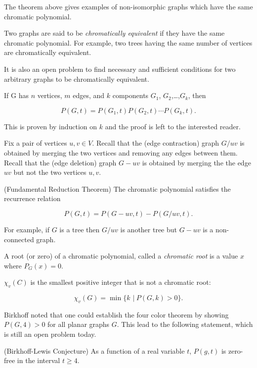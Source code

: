 The theorem above gives examples of non-isomorphic graphs which have
the same chromatic polynomial.


Two graphs are said to be {\it chromatically equivalent} if they have the
same chromatic polynomial. For example, two trees having the same
number of vertices are chromatically equivalent.

It is also an open problem to find necessary and sufficient conditions
for two arbitrary graphs to be chromatically equivalent.

\begin{theorem}
If G has $n$ vertices, $m$ edges, and $k$ components $G_1$,
$G_2$,\dots ,$G_k$, then

\[
P(G, t) = P(G_1, t)P(G_2,t) \cdots P(G_k,t).
\]
\end{theorem}

This is proven by induction on $k$ and the proof is left to the
interested reader.

Fix a pair of vertices $u, v\in V$.
Recall that the (edge contraction)
graph $G/uv$ is obtained by merging the two vertices and removing
any edges between them. Recall that the (edge deletion)
graph $G-uv$ is obtained by merging the the edge $uv$ but not the
two vertices $u,v$.

\begin{theorem}
(Fundamental Reduction Theorem)
The chromatic polynomial satisfies the recurrence relation

\[
    P(G,t) = P(G-uv, t) - P(G/uv,t) .
\]
\end{theorem}

For example, if $G$ is a tree then $ G/uv$ is another tree
but $ G-uv$ is a non-connected graph.

A root (or zero) of a chromatic polynomial, called a {\it chromatic root}
is a value $x$ where $P_G(x)=0$.

\begin{theorem}
$\chi_v(C)$ is the smallest positive integer that is not a chromatic root:

\[
    \chi_v (G)=\min\{ k\,\ |\ P(G,k) > 0 \}.
\]
\end{theorem}

Birkhoff noted that one could establish the four color theorem by
showing $P(G,4)>0$ for all planar graphs $G$. This lead to the
following statement, which is still an open problem today.

\begin{conjecture}
(Birkhoff-Lewis Conjecture)
As a function of a real variable $t$, $P(g,t)$ is zero-free in the
interval $t\geq 4$.
\end{conjecture}


